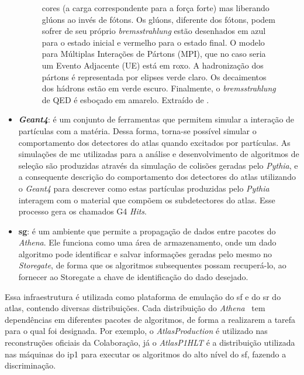 \begin{itemize}
\begin{figure}[b!]
\begin{minipage}{\textwidth}
{{{cores (a carga correspondente para a força forte) mas liberando glúons ao invés
de fótons. Os glúons, diferente dos fótons, podem sofrer de seu próprio
\emph{bremsstrahlung}}}
estão desenhados em azul para o estado inicial e vermelho para o estado
final. O modelo para Múltiplas Interações de Pártons (MPI), que no caso seria um
Evento Adjacente (UE) está em roxo. A hadronização dos pártons é representada
por elipses verde claro. Os decaimentos dos hádrons estão em verde escuro.
Finalmente, o \emph{bremsstrahlung} de QED é esboçado em amarelo.
Extraído de {\cite{mc_event}}.}
\setcounter{footnote}{\value{mpfootnote}}
\end{minipage}
\label{fig:evento_mc}
\end{figure}

\item \textbf{\emph{Geant4}}: é um conjunto de ferramentas que permitem simular a interação de
partículas com a matéria. Dessa forma, torna-se possível simular o comportamento
dos detectores do \gls{atlas} quando excitados por partículas. As simulações de
\gls{mc} utilizadas para a análise e desenvolvimento de algoritmos de seleção são
produzidas através da simulação de colisões geradas pelo \emph{Pythia}, e a consequente
descrição do comportamento dos detectores do \gls{atlas} utilizando o
\emph{Geant4} para descrever como estas partículas produzidas pelo \emph{Pythia} interagem 
com o material que compõem os subdetectores do \gls{atlas}. Esse processo gera
os chamados G4 \emph{Hits}.
\item \textbf{\gls{sg}}: é um ambiente que permite a propagação de dados entre pacotes do
\emph{Athena}. Ele funciona como uma área de armazenamento, onde um dado algoritmo pode
identificar e salvar informações geradas pelo mesmo no \emph{Storegate}, de forma que
os algoritmos subsequentes possam recuperá-lo, ao fornecer ao Storegate a chave
de identificação do dado desejado.
\end{itemize}

Essa infraestrutura é utilizada como plataforma de emulação do \glsdesc{sf} e do 
\gls{sr} do \gls{atlas}, contendo diversas
distribuições. Cada distribuição do \emph{Athena}~\cite{atlas_computing_tdr} 
tem dependências em diferentes
pacotes de algoritmos, de forma a realizarem a tarefa para o qual foi designada. 
Por exemplo, o \emph{AtlasProduction} é utilizado 
nas reconstruções oficiais da Colaboração, já o \emph{AtlasP1HLT} é a
distribuição utilizada nas máquinas do \gls{ip}1 para executar os algoritmos 
do alto nível do \glsdesc{sf}, fazendo a discriminação. 

